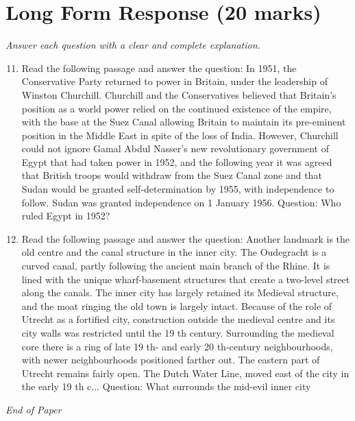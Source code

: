 \documentclass[12pt]{article}
\begin{document}
\section*{Long Form Response (20 marks)}
\textit{Answer each question with a clear and complete explanation.}
\begin{enumerate}[label=\arabic*.]
\setcounter{enumi}{10}
\item Read the following passage and answer the question: In 1951, the Conservative Party returned to power in Britain, under the leadership of Winston Churchill. Churchill and the Conservatives believed that Britain's position as a world power relied on the continued existence of the empire, with the base at the Suez Canal allowing Britain to maintain its pre-eminent position in the Middle East in spite of the loss of India. However, Churchill could not ignore Gamal Abdul Nasser's new revolutionary government of Egypt that had taken power in 1952, and the following year it was agreed that British troops would withdraw from the Suez Canal zone and that Sudan would be granted self-determination by 1955, with independence to follow. Sudan was granted independence on 1 January 1956. Question: Who ruled Egypt in 1952?
\item Read the following passage and answer the question: Another landmark is the old centre and the canal structure in the inner city. The Oudegracht is a curved canal, partly following the ancient main branch of the Rhine. It is lined with the unique wharf-basement structures that create a two-level street along the canals. The inner city has largely retained its Medieval structure, and the moat ringing the old town is largely intact. Because of the role of Utrecht as a fortified city, construction outside the medieval centre and its city walls was restricted until the 19 th century. Surrounding the medieval core there is a ring of late 19 th- and early 20 th-century neighbourhoods, with newer neighbourhoods positioned farther out. The eastern part of Utrecht remains fairly open. The Dutch Water Line, moved east of the city in the early 19 th c... Question: What surrounds the mid-evil inner city
\end{enumerate}

\vfill
\noindent\textit{End of Paper}
\end{document}
